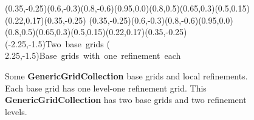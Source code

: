 \documentclass{article}
\begin{document}
\begin{figure}[htb]
\begin{center}
{      (0.35,-0.25)(0.6,-0.3)(0.8,-0.6)(0.95,0.0)(0.8,0.5)(0.65,0.3)(0.5,0.15)(0.22,0.17)(0.35,-0.25)%
    \psccurve[hatchcolor=mediumturquoise,fillstyle=crosshatch,hatchangle=30,hatchsep=3pt,linewidth=1pt]%
      (0.35,-0.25)(0.6,-0.3)(0.8,-0.6)(0.95,0.0)(0.8,0.5)(0.65,0.3)(0.5,0.15)(0.22,0.17)(0.35,-0.25)%
  }%
  (-2.25,-1.5){\mbox{\hss Two base grids\hss}}
  ( 2.25,-1.5){\mbox{\hss Base grids with one refinement each\hss}}
\endpspicture\end{center}
\caption[Some \textbf{GenericGridCollection} base grids and local refinements]
        {Some \textbf{GenericGridCollection} base grids and local refinements.  Each base grid has one level-one refinement grid.
         This \textbf{GenericGridCollection} has two base grids and two refinement levels.
        \label{GenericGridCollection:BaseGridsAndRefinements}}
\end{figure}
\end{document}
